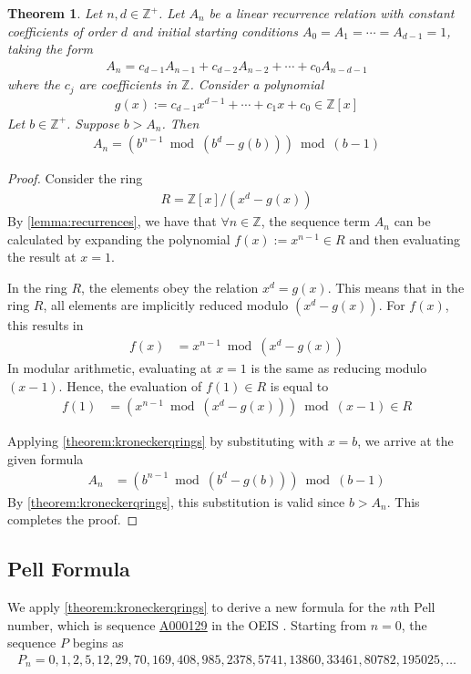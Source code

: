 \documentclass[11pt,reqno]{article}
\theoremstyle{plain}
\newtheorem{theorem}{Theorem}
\theoremstyle{definition}
\newcommand{\seqnum}[1]{\href{https://oeis.org/#1}{\rm \underline{#1}}}
\begin{document}
\begin{theorem} \label{theorem:recurrences}
Let $n,d \in \mathbb{Z}^+$. Let $A_n$ be a linear recurrence relation with constant coefficients of order $d$ and initial starting conditions $A_0=A_1=\cdots=A_{d-1}=1$, taking the form
\begin{align*}
    A_{n} = c_{d-1} A_{n-1} + c_{d-2} A_{n-2} + \cdots + c_{0} A_{n-d-1}
\end{align*}
where the $c_j$ are coefficients in $\mathbb{Z}$. Consider a polynomial
\begin{align*}
    g(x) := c_{d-1} x^{d-1} + \cdots + c_1 x + c_0 \in \mathbb{Z}[x]
\end{align*}
Let $b \in \mathbb{Z}^+$. Suppose $b > A_n$. Then
\begin{align*}
    A_{n} = \left(b^{n-1} \bmod{(b^d - g(b))}\right) \bmod{(b-1)}
\end{align*}
\end{theorem}
\begin{proof}
Consider the ring
\begin{align*}
    R = \mathbb{Z}[x]/(x^d-g(x))
\end{align*}
By \cref{lemma:recurrences}, we have that $\forall n \in \mathbb{Z}$, the sequence term $A_n$ can be calculated by expanding the polynomial $f(x) := x^{n-1} \in R$ and then evaluating the result at $x=1$.

In the ring $R$, the elements obey the relation $x^d = g(x)$. This means that in the ring $R$, all elements are implicitly reduced modulo $(x^d - g(x))$. For $f(x)$, this results in 
\begin{align*}
    f(x) &= x^{n-1} \bmod{(x^d - g(x))}
\end{align*}
In modular arithmetic, evaluating at $x=1$ is the same as reducing modulo $(x-1)$. Hence, the evaluation of $f(1) \in R$ is equal to
\begin{align*}
    f(1) &= \left(x^{n-1} \bmod{(x^d - g(x))}\right) \bmod{(x-1)} \in R
\end{align*}

Applying \cref{theorem:kroneckerqrings} by substituting with $x = b$, we arrive at the given formula
\begin{align*}
    A_n &= \left(b^{n-1} \bmod{(b^d - g(b))}\right) \bmod{(b-1)}
\end{align*}
By \cref{theorem:kroneckerqrings}, this substitution is valid since $b > A_n$. This completes the proof.
\end{proof}

\subsection{Pell Formula}
We apply \cref{theorem:kroneckerqrings} to derive a new formula for the $n$th Pell number, which is sequence \seqnum{A000129} in the OEIS \cite{A000129}. Starting from $n=0$, the sequence $P$ begins as
\begin{align*}
    P_n = 0, 1, 2, 5, 12, 29, 70, 169, 408, 985, 2378, 5741, 13860, 33461, 80782, 195025, \ldots
\end{align*}
\end{document}

